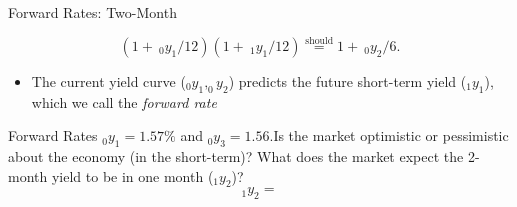 \documentclass{beamer}
\newcommand{\should}{\overset{\text{should}}{=}}
\begin{document}
\iffalse
\begin{frame}{Forward Rates: Two-Month}
	\begin{figure}[H]
		\begin{center}
		\end{center}
	\end{figure}
	\vfill
	\begin{equation}
		(1+\:_{0}y_{1}/12)(1+\:_{1}y_{1}/12)\should1+\:_{0}y_{2}/6. 
	\end{equation}
	\begin{itemize}
		\item The current yield curve ($_{0}y_{1},_{0}y_{2}$) predicts the future short-term yield ($_{1}y_{1}$), which we call the \textit{forward rate}
	\end{itemize}
\end{frame}

\begin{frame}{Forward Rates}
$_0y_1=1.57\%$ and $_0y_3=1.56. $Is the market optimistic or pessimistic about the economy (in the short-term)? What does the market expect the 2-month yield to be in one month ($_1y_2$)?
	\pause
	{\color{blue}
		\begin{equation}
			_{1}y_{2}=
		\end{equation}
	}
\end{frame}
\end{document}
